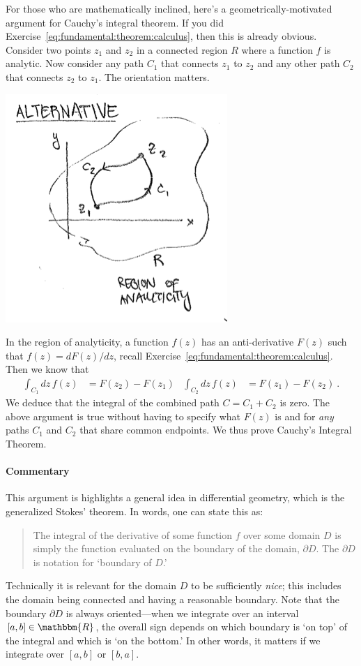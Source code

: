 \documentclass[
  11pt,
	colorful,
	raggedright,
]{tufte-style-thesis-flip}
\begin{document}
For those who are mathematically inclined, here's a geometrically-motivated argument for Cauchy's integral theorem. If you did Exercise~\eqref{eq:fundamental:theorem:calculus}, then this is already obvious. Consider two points $z_1$ and $z_2$ in a connected region $R$ where a function $f$ is analytic. Now consider any path $C_1$ that connects $z_1$ to $z_2$ and any other path $C_2$ that connects $z_2$ to $z_1$. The orientation matters.
\begin{center}
\includegraphics[width=.5\textwidth]{figures/Lec_2017_paths.png}
\end{center}
In the region of analyticity, a function $f(z)$ has an anti-derivative $F(z)$ such that $f(z) = dF(z)/dz$, recall Exercise~\ref{eq:fundamental:theorem:calculus}. Then we know that
\begin{align}
  \int_{C_1} dz\, f(z) &= F(z_2) - F(z_1)
  &
  \int_{C_2} dz\, f(z) &= F(z_1) - F(z_2) \ .
\end{align}
We deduce that the integral of the combined path $C=C_1+C_2$ is zero. The above argument is true without having to specify what $F(z)$ is and for \emph{any} paths $C_1$ and $C_2$ that share common endpoints. We thus prove Cauchy's Integral Theorem.

\paragraph{Commentary}
This argument is highlights a general idea in differential geometry, which is the generalized Stokes' theorem. In words, one can state this as:
\begin{quote}
The integral of the derivative of some function $f$ over some domain $D$ is simply the function evaluated on the boundary of the domain, $\partial D$. The $\partial D$ is notation for `boundary of $D$.'
\end{quote}
Technically it is relevant for the domain $D$ to be sufficiently \emph{nice}; this includes the domain being connected and having a reasonable boundary. Note that the boundary $\partial D$ is always oriented---when we integrate over an interval $[a,b]\in \mathbbm{R}$, the overall sign depends on which boundary is `on top' of the integral and which is `on the bottom.' In other words, it matters if we integrate over $[a,b]$ or $[b,a]$. 
\end{document}
